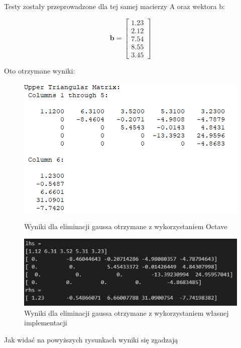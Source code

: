 \documentclass{article}
\begin{document}
Testy zostały przeprowadzone dla tej samej macierzy A oraz wektora b:

\[\mathbf{b} = \begin{bmatrix} 1.23 \\ 2.12 \\ 7.54 \\ 8.55 \\ 3.45 \end{bmatrix}\]

\noindent
Oto otrzymane wyniki:

\begin{figure}[H]
  \begin{minipage}[b]{0.49\textwidth}
    \includegraphics[width=\textwidth]{images/octave_comparison_gauss_octave.png}
    \caption{Wyniki dla eliminacji gaussa otrzymane z wykorzystaniem Octave}
  \end{minipage}
  \hfill
  \begin{minipage}[b]{0.49\textwidth}
    \includegraphics[width=\textwidth]{images/octave_comparison_gauss_own.png}
    \caption{Wyniki dla eliminacji gaussa  otrzymane z wykorzystaniem własnej implementacji}
  \end{minipage}
\end{figure}

Jak widać na powyższych rysunkach wyniki się zgadzają
\end{document}
